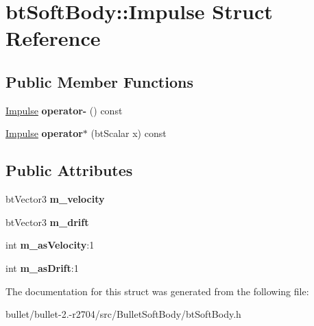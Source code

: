\hypertarget{structbt_soft_body_1_1_impulse}{\section{bt\+Soft\+Body\+:\+:Impulse Struct Reference}
\label{structbt_soft_body_1_1_impulse}
}
\subsection*{Public Member Functions}
\begin{DoxyCompactItemize}
\item 
\hypertarget{structbt_soft_body_1_1_impulse_aa090875f577d951d84a84a89d23ec999}{\hyperlink{structbt_soft_body_1_1_impulse}{Impulse} {\bfseries operator-\/} () const }\label{structbt_soft_body_1_1_impulse_aa090875f577d951d84a84a89d23ec999}

\item 
\hypertarget{structbt_soft_body_1_1_impulse_a8f00456db875501b011de31c21e4f312}{\hyperlink{structbt_soft_body_1_1_impulse}{Impulse} {\bfseries operator$\ast$} (bt\+Scalar x) const }\label{structbt_soft_body_1_1_impulse_a8f00456db875501b011de31c21e4f312}

\end{DoxyCompactItemize}
\subsection*{Public Attributes}
\begin{DoxyCompactItemize}
\item 
\hypertarget{structbt_soft_body_1_1_impulse_a8456d87d37e70f0734f6f374d2793899}{bt\+Vector3 {\bfseries m\+\_\+velocity}}\label{structbt_soft_body_1_1_impulse_a8456d87d37e70f0734f6f374d2793899}

\item 
\hypertarget{structbt_soft_body_1_1_impulse_a264b6b2fd236213db5e79322cef5f327}{bt\+Vector3 {\bfseries m\+\_\+drift}}\label{structbt_soft_body_1_1_impulse_a264b6b2fd236213db5e79322cef5f327}

\item 
\hypertarget{structbt_soft_body_1_1_impulse_ae607701d136e2334189803d44f3a2211}{int {\bfseries m\+\_\+as\+Velocity}\+:1}\label{structbt_soft_body_1_1_impulse_ae607701d136e2334189803d44f3a2211}

\item 
\hypertarget{structbt_soft_body_1_1_impulse_a48e0f46f144d9cacca2333788d3df56d}{int {\bfseries m\+\_\+as\+Drift}\+:1}\label{structbt_soft_body_1_1_impulse_a48e0f46f144d9cacca2333788d3df56d}

\end{DoxyCompactItemize}


The documentation for this struct was generated from the following file\+:\begin{DoxyCompactItemize}
\item 
bullet/bullet-\/2.-\/r2704/src/\+Bullet\+Soft\+Body/bt\+Soft\+Body.\+h\end{DoxyCompactItemize}
